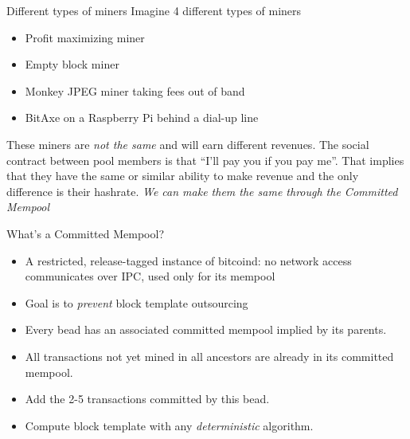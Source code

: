 \documentclass[tikz,mathserif,usenames,dvipsnames,svgnames,table]{beamer}
\newlength{\wideitemsep}
\let\olditem\item
\renewcommand{\item}{\setlength{\itemsep}{\wideitemsep}\olditem}
\begin{document}
\begin{frame}{Different types of miners}
    Imagine 4 different types of miners
    \begin{itemize}
        \item Profit maximizing miner
        \item Empty block miner
        \item Monkey JPEG miner taking fees out of band
        \item BitAxe on a Raspberry Pi behind a dial-up line
    \end{itemize}
    These miners are {\it not the same} and will earn different revenues.
    \vspace{0.2cm}
    The social contract between pool members is that ``I'll pay you if you pay
    me''. That implies that they have the same or similar ability to make
    revenue and the only difference is their hashrate.
    \vspace{0.2cm}
    {\it We can make them the same through the Committed Mempool}
\end{frame}
\begin{frame}{What's a Committed Mempool?}
    \begin{itemize}
        \item A restricted, release-tagged instance of bitcoind: no network access communicates over
            IPC, used only for its mempool
        \item Goal is to {\it prevent} block template outsourcing
        \item Every bead has an associated committed mempool implied by its parents.
        \item All transactions not yet mined in all ancestors are already in its committed mempool.
        \item Add the 2-5 transactions committed by this bead.
        \item Compute block template with any {\it deterministic} algorithm.
    \end{itemize}
\end{frame}
\end{document}
